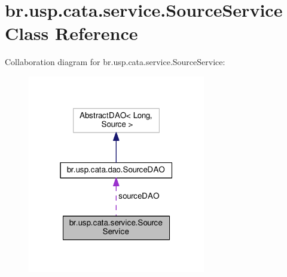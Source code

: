 \hypertarget{classbr_1_1usp_1_1cata_1_1service_1_1_source_service}{\section{br.\+usp.\+cata.\+service.\+Source\+Service Class Reference}
\label{classbr_1_1usp_1_1cata_1_1service_1_1_source_service}
}


Collaboration diagram for br.\+usp.\+cata.\+service.\+Source\+Service\+:\nopagebreak
\begin{figure}[H]
\begin{center}
\leavevmode
\includegraphics[width=220pt]{classbr_1_1usp_1_1cata_1_1service_1_1_source_service__coll__graph}
\end{center}
\end{figure}
